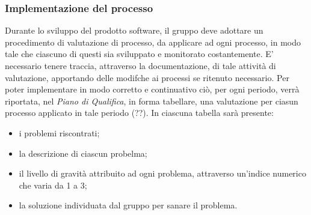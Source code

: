 \subsubsection{Implementazione del processo} \label{ProcessiOrganizzativiProcessoDiMiglioramentoImplementazioneDelProcesso}
Durante lo sviluppo del prodotto software, il gruppo deve adottare un procedimento di valutazione di processo, da applicare ad ogni processo, in modo tale che ciascuno di questi sia sviluppato e monitorato costantemente. E' necessario tenere traccia, attraverso la documentazione, di tale attività di valutazione, apportando delle modifche ai processi se ritenuto necessario. 
Per poter implementare in modo corretto e continuativo ciò, per ogni periodo, verrà riportata, nel \textit{Piano di Qualifica}, in forma tabellare, una valutazione per ciasun processo applicato in tale periodo (??). In ciascuna tabella sarà presente:
\begin{itemize}
	\item i problemi riscontrati;
	\item la descrizione di ciascun probelma;
	\item il livello di gravità attribuito ad ogni problema, attraverso un'indice numerico che varia da 1 a 3;
	\item la soluzione individuata dal gruppo per sanare il problema.
\end{itemize}

